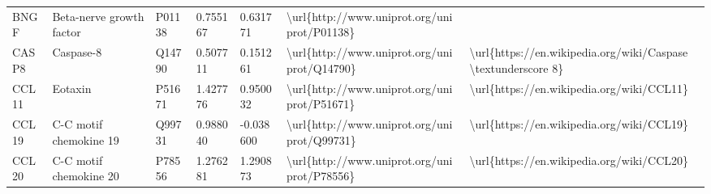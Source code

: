 \begin{table}[]
\begin{tabular}{lllllll}
\multicolumn{1}{l|}{BNGF}     & Beta-nerve growth factor                                      & P01138  & 0.755167           & 0.631771          & \textbackslash{}url\{http://www.uniprot.org/uniprot/P01138\} &                                                                                                                                                                                                                                                                                                    \\
\multicolumn{1}{l|}{CASP8}    & Caspase-8                                                     & Q14790  & 0.507711           & 0.151261          & \textbackslash{}url\{http://www.uniprot.org/uniprot/Q14790\} & \textbackslash{}url\{https://en.wikipedia.org/wiki/Caspase \textbackslash{}textunderscore 8\}                                                                                                                                                                                                      \\
\multicolumn{1}{l|}{CCL11}    & Eotaxin                                                       & P51671  & 1.427776           & 0.950032          & \textbackslash{}url\{http://www.uniprot.org/uniprot/P51671\} & \textbackslash{}url\{https://en.wikipedia.org/wiki/CCL11\}                                                                                                                                                                                                                                         \\
\multicolumn{1}{l|}{CCL19}    & C-C motif chemokine 19                                        & Q99731  & 0.988040           & -0.038600         & \textbackslash{}url\{http://www.uniprot.org/uniprot/Q99731\} & \textbackslash{}url\{https://en.wikipedia.org/wiki/CCL19\}                                                                                                                                                                                                                                         \\
\multicolumn{1}{l|}{CCL20}    & C-C motif chemokine 20                                        & P78556  & 1.276281           & 1.290873          & \textbackslash{}url\{http://www.uniprot.org/uniprot/P78556\} & \textbackslash{}url\{https://en.wikipedia.org/wiki/CCL20\}                                                                                                                                                                                                                                         \\

\end{tabular}
\end{table}
